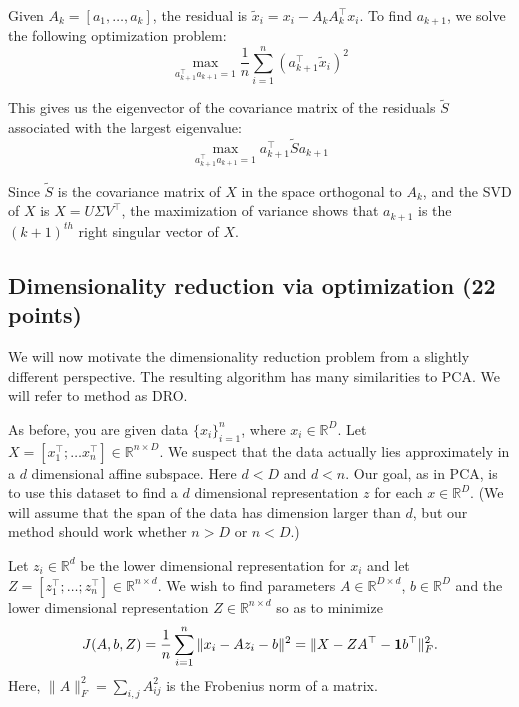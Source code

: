 \documentclass[a4paper]{article}
\newcounter{thm}
\newcommand*{\one}{{\bf 1}}
\theoremstyle{definition}
\newcommand{\RR}{\mathbb{R}}
\newenvironment{soln}{
    \leavevmode\color{blue}\ignorespaces
}{}
\begin{document}
\begin{enumerate}
\begin{soln}
    
    Given \( A_k = [a_1, \dots, a_k] \), the residual is \( \tilde{x}_i = x_i - A_k A_k^\top x_i \). To find \( a_{k+1} \), we solve the following optimization problem:
    \[
    \max_{a_{k+1}^\top a_{k+1} = 1} \frac{1}{n} \sum_{i=1}^n (a_{k+1}^\top \tilde{x}_i)^2
    \]

    This gives us the eigenvector of the covariance matrix of the residuals \( \tilde{S} \) associated with the largest eigenvalue:
    \[
    \max_{a_{k+1}^\top a_{k+1} = 1} a_{k+1}^\top \tilde{S} a_{k+1}
    \]

    Since \( \tilde{S} \) is the covariance matrix of \( X \) in the space orthogonal to \( A_k \), and the SVD
    of \( X \) is \( X = U \Sigma V^\top \), the maximization of variance shows that \( a_{k+1} \) is the \((k+1)^{th}\) right 
    singular vector of \( X \).
\end{soln}


\end{enumerate}


\subsection{Dimensionality reduction via optimization (22 points)}

We will now motivate the dimensionality reduction problem from a slightly different
perspective. The resulting algorithm has many similarities to PCA.
We will refer to method as DRO.

As before, you are given data $\{x_i\}_{i=1}^n$, where $x_i \in \RR^D$. Let $X=[x_1^\top; \dots
x_n^\top] \in \RR^{n\times D}$. We suspect that the data
actually lies approximately in  a $d$ dimensional affine subspace.
Here $d<D$ and $d<n$.
Our goal, as in PCA, is to use this dataset to find a $d$ dimensional representation $z$ for each $x\in\RR^D$.
(We will assume that the span of the data has dimension larger than
$d$, but our method should work whether $n>D$ or $n<D$.)


Let $z_i\in \RR^d$ be the lower dimensional representation for $x_i$ and
let $Z = [z_1^\top; \dots; z_n^\top] \in \RR^{n\times d}$.
We wish to find parameters $A \in \RR^{D\times d}$, $b\in\RR^D$ and the lower
dimensional representation $Z\in \RR^{n\times d}$ so as to minimize 
\begin{equation}
J(A,b,Z) = \frac{1}{n} \sum_{i=1}^n \|x_i - Az_i - b\|^2 = \| X - ZA^\top - \one b^\top\|_F^2.
\label{eqn:dimobj}
\end{equation}
Here, $\|A\|^2_F = \sum_{i,j} A_{ij}^2$ is the Frobenius norm of a matrix.
\end{document}
